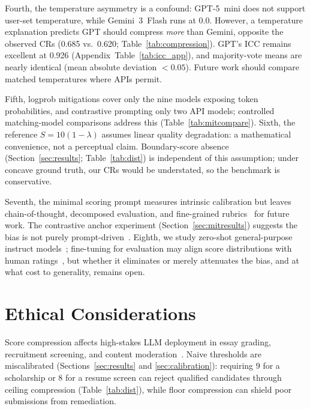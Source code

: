 \documentclass[11pt]{article}
\begin{document}
Fourth, the temperature asymmetry is a confound: GPT-5~mini does not
support user-set temperature, while Gemini~3~Flash runs at 0.0. However,
a temperature explanation predicts GPT should compress \emph{more} than
Gemini, opposite the observed CRs (0.685 vs.\ 0.620;
Table~\ref{tab:compression}). GPT's ICC remains excellent at 0.926
(Appendix~Table~\ref{tab:icc_app}), and majority-vote means are nearly
identical (mean absolute deviation $<0.05$). Future work should compare
matched temperatures where APIs permit.

Fifth, logprob mitigations cover only the nine models exposing token
probabilities, and contrastive prompting only two API models; controlled
matching-model comparisons address this (Table~\ref{tab:mitcompare}).
Sixth, the reference $S=10(1-\lambda)$ assumes linear quality degradation:
a mathematical convenience, not a perceptual claim. Boundary-score
absence (Section~\ref{sec:results}; Table~\ref{tab:dist}) is independent
of this assumption; under concave ground truth, our CRs would be
understated, so the benchmark is conservative.

Seventh, the minimal scoring prompt measures intrinsic calibration but
leaves chain-of-thought, decomposed evaluation, and fine-grained
rubrics~\citep{liu2023geval} for future work. The contrastive anchor
experiment (Section~\ref{sec:mitresults}) suggests the bias is not purely
prompt-driven~\citep{rafailov2023direct}. Eighth, we study zero-shot
general-purpose instruct models~\citep{zheng2023judging}; fine-tuning for
evaluation may align score distributions with human ratings~\citep{ke2019automated},
but whether it eliminates or merely attenuates the bias, and at what
cost to generality, remains open.

\section*{Ethical Considerations}

Score compression affects high-stakes LLM deployment in essay grading,
recruitment screening, and content moderation~\citep{zheng2023judging}.
Naive thresholds are miscalibrated (Sections~\ref{sec:results} and
\ref{sec:calibration}): requiring 9 for a scholarship or 8 for a resume
screen can reject qualified candidates through ceiling compression
(Table~\ref{tab:dist}), while floor compression can shield poor
submissions from remediation.
\end{document}
